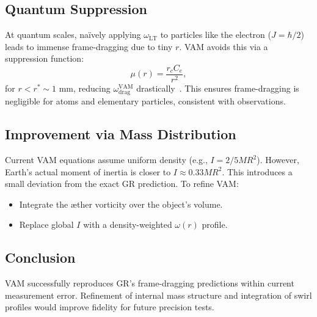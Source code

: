 \subsection*{Quantum Suppression}
At quantum scales, naïvely applying $\omega_\text{LT}$ to particles like the electron ($J = \hbar/2$) leads to immense frame-dragging due to tiny $r$. VAM avoids this via a suppression function:
\[
    \mu(r) = \frac{r_c C_e}{r^2},
\]
for $r < r^* \sim 1$ mm, reducing $\omega^\text{VAM}_\text{drag}$ drastically~\cite{iskandarani2025VAM2}. This ensures frame-dragging is negligible for atoms and elementary particles, consistent with observations.

\subsection*{Improvement via Mass Distribution}
Current VAM equations assume uniform density (e.g., $I = 2/5MR^2$). However, Earth’s actual moment of inertia is closer to $I \approx 0.33MR^2$. This introduces a small deviation from the exact GR prediction. To refine VAM:
\begin{itemize}
    \item Integrate the æther vorticity over the object’s volume.
    \item Replace global $I$ with a density-weighted $\omega(r)$ profile.
\end{itemize}

\subsection*{Conclusion}
VAM successfully reproduces GR’s frame-dragging predictions within current measurement error. Refinement of internal mass structure and integration of swirl profiles would improve fidelity for future precision tests.